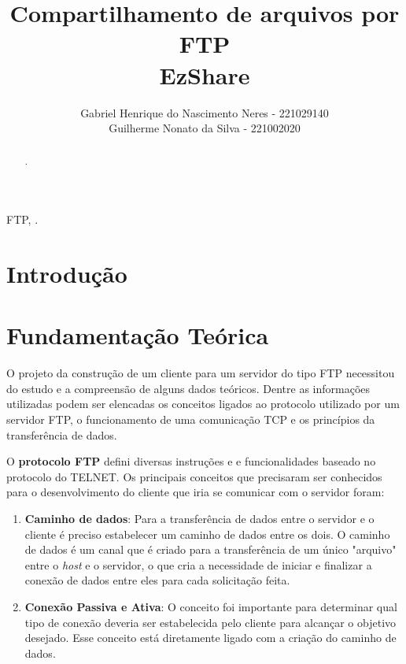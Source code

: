 \documentclass[11pt]{IEEEtran}
\title{Compartilhamento de arquivos por FTP \\ \LARGE EzShare}
\author{Gabriel Henrique do Nascimento Neres - 221029140 \\ Guilherme Nonato da Silva - 221002020}
\renewcommand{\b}[1]{\textbf{#1}} %
\newcommand{\pontoI}{\begin{enumerate}[\indent \indent $\bullet$]} %
\newcommand{\fim}{\end{enumerate}} %
\begin{document}
\maketitle

\begin{abstract}
   . 
\end{abstract}

\begin{keywords}
   FTP, .
\end{keywords}



\section{Introdução}



\section{Fundamentação Teórica}

O projeto da construção de um cliente para um servidor do tipo FTP necessitou do estudo e a compreensão de alguns dados teóricos. Dentre as informações utilizadas podem ser elencadas os conceitos ligados ao protocolo utilizado por um servidor FTP, o funcionamento de uma comunicação TCP e os princípios da transferência de dados.

O \b{protocolo FTP} defini diversas instruções e e funcionalidades baseado no protocolo do TELNET. Os principais conceitos que precisaram ser conhecidos para o desenvolvimento do cliente que iria se comunicar com o servidor foram:
\pontoI
   \item \b{Caminho de dados}: Para a transferência de dados entre o servidor e o cliente é preciso estabelecer um caminho de dados entre os dois. O caminho de dados é um canal que é criado para a transferência de um único "arquivo" entre o \textit{host} e o servidor, o que cria a necessidade de iniciar e finalizar a conexão de dados entre eles para cada solicitação feita.
   \item \b{Conexão Passiva e Ativa}: O conceito foi importante para determinar qual tipo de conexão deveria ser estabelecida pelo cliente para alcançar o objetivo desejado. Esse conceito está diretamente ligado com a criação do caminho de dados.
\fim
\end{document}
